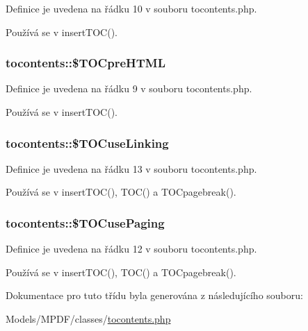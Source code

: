 Definice je uvedena na řádku 10 v souboru tocontents.\-php.



Používá se v insert\-T\-O\-C().

\hypertarget{classtocontents_a4ae235667ddb9615e50edc6b2ea7528c}{
\subsubsection[{\$\-T\-O\-Cpre\-H\-T\-M\-L}]{\setlength{\rightskip}{0pt plus 5cm}tocontents\-::\$\-T\-O\-Cpre\-H\-T\-M\-L}}\label{classtocontents_a4ae235667ddb9615e50edc6b2ea7528c}


Definice je uvedena na řádku 9 v souboru tocontents.\-php.



Používá se v insert\-T\-O\-C().

\hypertarget{classtocontents_a8fad1b522141a49147c2a3f503a76715}{
\subsubsection[{\$\-T\-O\-Cuse\-Linking}]{\setlength{\rightskip}{0pt plus 5cm}tocontents\-::\$\-T\-O\-Cuse\-Linking}}\label{classtocontents_a8fad1b522141a49147c2a3f503a76715}


Definice je uvedena na řádku 13 v souboru tocontents.\-php.



Používá se v insert\-T\-O\-C(), T\-O\-C() a T\-O\-Cpagebreak().

\hypertarget{classtocontents_ac8c5f167244c0d7137eddee1803596ff}{
\subsubsection[{\$\-T\-O\-Cuse\-Paging}]{\setlength{\rightskip}{0pt plus 5cm}tocontents\-::\$\-T\-O\-Cuse\-Paging}}\label{classtocontents_ac8c5f167244c0d7137eddee1803596ff}


Definice je uvedena na řádku 12 v souboru tocontents.\-php.



Používá se v insert\-T\-O\-C(), T\-O\-C() a T\-O\-Cpagebreak().



Dokumentace pro tuto třídu byla generována z následujícího souboru\-:\begin{DoxyCompactItemize}
\item 
Models/\-M\-P\-D\-F/classes/\hyperlink{tocontents_8php}{tocontents.\-php}\end{DoxyCompactItemize}
